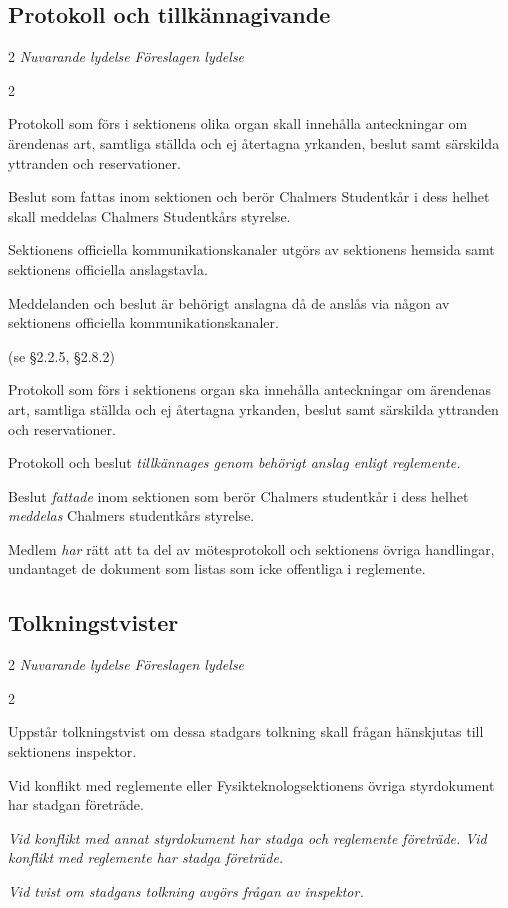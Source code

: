\documentclass{article}
\newenvironment{lydelse}
    {\begin{paracol}{2}%
        \emph{Nuvarande lydelse}%
        \switchcolumn%
        \emph{Föreslagen lydelse}%
    \end{paracol}%
    \begin{enumerate}[label=\thesubsection.\arabic*]%
    \begin{paracol}{2}%
    }{\end{paracol}\end{enumerate}}
\begin{document}
\subsection{Protokoll och tillkännagivande} \label{15.2:proto}
\begin{lydelse}
  \setcounter{section}{14}
  \setcounter{subsection}{5}
  \item Protokoll som förs i sektionens olika organ skall innehålla anteckningar om ärendenas art, samtliga ställda och ej återtagna yrkanden, beslut samt särskilda yttranden och reservationer.
  \item Beslut som fattas inom sektionen och berör Chalmers Studentkår i dess helhet skall meddelas Chalmers Studentkårs styrelse.
  \item Sektionens officiella kommunikationskanaler utgörs av sektionens hemsida samt sektionens officiella anslagstavla.
  \item Meddelanden och beslut är behörigt anslagna då de anslås via någon av sektionens officiella kommunikationskanaler.
  \item[] (se \S 2.2.5, \S 2.8.2) 
  \switchcolumn
  \setcounter{subsection}{3}
  \item Protokoll som förs i sektionens organ ska innehålla anteckningar om ärendenas art, samtliga ställda och ej återtagna yrkanden, beslut samt särskilda yttranden och reservationer.
  \item Protokoll och beslut \emph{tillkännages genom behörigt anslag enligt reglemente.}
  \item Beslut \emph{fattade} inom sektionen som berör Chalmers studentkår i dess helhet \emph{meddelas} Chalmers studentkårs styrelse.
  \item Medlem \emph{har} rätt att ta del av mötesprotokoll och sektionens övriga handlingar, undantaget de dokument som listas som icke offentliga i reglemente. \label{15.x:offentlighet}
\end{lydelse}
\setcounter{section}{15}
\setcounter{subsection}{3}

\subsection{Tolkningstvister}
\begin{lydelse}
  \setcounter{section}{14}
  \setcounter{subsection}{4}
  \item Uppstår tolkningstvist om dessa stadgars tolkning skall frågan hänskjutas till sektionens inspektor.
  \item Vid konflikt med reglemente eller Fysikteknologsektionens övriga styrdokument har stadgan företräde.
  \switchcolumn
  \item \emph{Vid konflikt med annat styrdokument har stadga och reglemente företräde. Vid konflikt med reglemente har stadga företräde.}
  \label{S:TolkningStadgaFore}
  \item \emph{Vid tvist om stadgans tolkning avgörs frågan av inspektor.}
\end{lydelse}
\setcounter{section}{15} 
\end{document}
